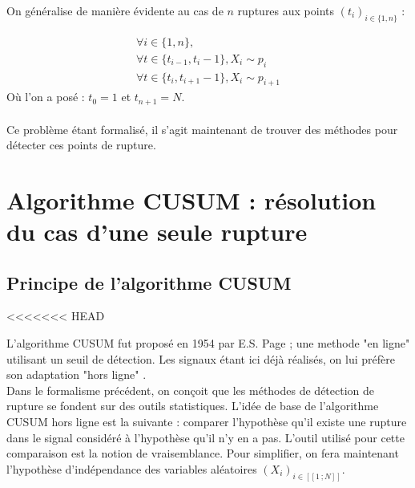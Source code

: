 \documentclass[french,12pt,notitlepage]{report}
\begin{document}
	On généralise de manière évidente au cas de $n$ ruptures aux points $(t_i)_{i \in \{1, n\}}$ :

	\begin{equation}
	\begin{array}{lll}
		\forall i \in \{1, n\}, \\
		\forall t \in \{t_{i-1}, t_i-1\}, X_i \sim p_i \\
		\forall t \in \{t_i, t_{i+1}-1\}, X_i \sim p_{i+1}
	\end{array}
	\label{multi_rupt}
	\end{equation}
	Où l'on a posé : $t_0 = 1$ et $t_{n+1} = N$.
	\\ \\
	Ce problème étant formalisé, il s'agit maintenant de trouver des méthodes pour détecter ces points de rupture.

	\chapter{Algorithme CUSUM : résolution du cas d'une seule rupture}


	\section{Principe de l'algorithme CUSUM}
<<<<<<< HEAD
	
	
	L'algorithme CUSUM fut proposé en 1954 par E.S. Page \cite{CIS} ; une methode "en ligne" utilisant un seuil de détection.
	Les signaux étant ici déjà réalisés, on lui préfère son adaptation "hors ligne" \cite{DAC}.
	\\
	
	Dans le formalisme précédent, on conçoit que les méthodes de détection de rupture se fondent sur des outils statistiques.
	L'idée de base de l'algorithme CUSUM hors ligne est la suivante :
	comparer l'hypothèse qu'il existe une rupture dans le signal considéré à l'hypothèse qu'il n'y en a pas.
	L'outil utilisé pour cette comparaison est la notion de vraisemblance.
	Pour simplifier, on fera maintenant l'hypothèse d'indépendance des variables aléatoires $(X_i)_{i \in [\![1\,; N]\!]}$.
	\\
	
\end{document}
